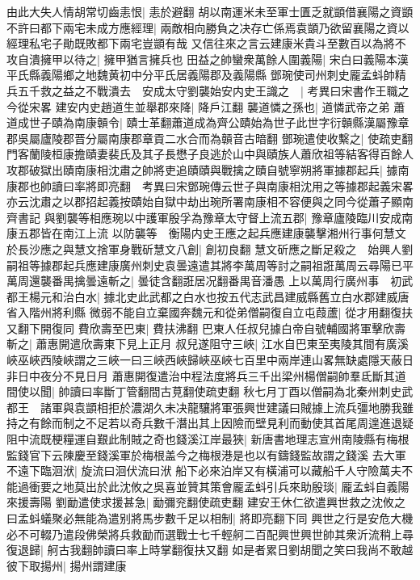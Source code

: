 由此大失人情胡常切齒恚恨|{
	恚於避翻}
胡以南運米未至軍士匱乏就顗借襄陽之資顗不許曰都下兩宅未成方應經理|{
	兩敵相向勝負之决存亡係焉袁顗乃欲留襄陽之資以經理私宅子勛既敗都下兩宅豈顗有哉}
又信往來之言云建康米貴斗至數百以為將不攻自潰擁甲以待之|{
	擁甲猶言擁兵也}
田益之帥蠻衆萬餘人圍義陽|{
	宋白曰義陽本漢平氏縣義陽鄉之地魏黄初中分平氏居義陽郡及義陽縣}
鄧琬使司州刺史龎孟蚪帥精兵五千救之益之不戰潰去　安成太守劉襲始安内史王識之　|{
	考異曰宋書作王職之今從宋畧}
建安内史趙道生並舉郡來降|{
	降戶江翻}
襲道憐之孫也|{
	道憐武帝之弟}
蕭道成世子賾為南康贑令|{
	賾士革翻蕭道成為齊公賾始為世子此世字衍贑縣漢屬豫章郡吳屬廬陵郡晋分屬南康郡章貢二水合而為贑音古暗翻}
鄧琬遣使收繫之|{
	使疏吏翻}
門客蘭陵桓康擔賾妻裴氏及其子長懋子良逃於山中與賾族人蕭欣祖等結客得百餘人攻郡破獄出賾南康相沈肅之帥將吏追賾賾與戰擒之賾自號寧朔將軍據郡起兵|{
	據南康郡也帥讀曰率將即亮翻　考異曰宋鄧琬傳云世子與南康相沈用之等據郡起義宋畧亦云沈肅之以郡招起義按賾始自獄中劫出琬所署南康相不容便與之同今從蕭子顯南齊書記}
與劉襲等相應琬以中護軍殷孚為豫章太守督上流五郡|{
	豫章廬陵臨川安成南康五郡皆在南江上流}
以防襲等　衡陽内史王應之起兵應建康襲擊湘州行事何慧文於長沙應之與慧文捨軍身戰斫慧文八創|{
	創初良翻}
慧文斫應之斷足殺之　始興人劉嗣祖等據郡起兵應建康廣州刺史袁曇遠遣其將李萬周等討之嗣祖誑萬周云尋陽已平萬周還襲番禺擒曇遠斬之|{
	曇徒含翻誑居况翻番禺音潘愚}
上以萬周行廣州事　初武都王楊元和治白水|{
	據北史此武都之白水也按五代志武昌建威縣舊立白水郡建威唐省入階州將利縣}
微弱不能自立棄國奔魏元和從弟僧嗣復自立屯葭蘆|{
	從才用翻復扶又翻下開復同}
費欣壽至巴東|{
	費扶沸翻}
巴東人任叔兒據白帝自號輔國將軍擊欣壽斬之|{
	蕭惠開遣欣壽東下見上正月}
叔兒遂阻守三峽|{
	江水自巴東至夷陵其間有廣溪峽巫峽西陵峽謂之三峽一曰三峽西峽歸峽巫峽七百里中兩岸連山畧無缺處隱天蔽日非日中夜分不見日月}
蕭惠開復遣治中程法度將兵三千出梁州楊僧嗣帥羣氐斷其道間使以聞|{
	帥讀曰率斷丁管翻間古莧翻使疏吏翻}
秋七月丁酉以僧嗣為北秦州刺史武都王　諸軍與袁顗相拒於濃湖久未决龍驤將軍張興世建議曰賊據上流兵彊地勝我雖持之有餘而制之不足若以奇兵數千潛出其上因險而壁見利而動使其首尾周遑進退疑阻中流既梗糧運自艱此制賊之奇也錢溪江岸最狹|{
	新唐書地理志宣州南陵縣有梅根監錢官下云陳慶至錢溪軍於梅根盖今之梅根港是也以有鑄錢監故謂之錢溪}
去大軍不遠下臨洄洑|{
	旋流曰洄伏流曰洑}
船下必來泊岸又有橫浦可以藏船千人守險萬夫不能過衝要之地莫出於此沈攸之吳喜並贊其策會龎孟蚪引兵來助殷琰|{
	龎孟蚪自義陽來援壽陽}
劉勔遣使求援甚急|{
	勔彌兖翻使疏吏翻}
建安王休仁欲遣興世救之沈攸之曰孟蚪蟻聚必無能為遣别將馬步數千足以相制|{
	將即亮翻下同}
興世之行是安危大機必不可輟乃遣段佛榮將兵救勔而選戰士七千輕舸二百配興世興世帥其衆沂流稍上尋復退歸|{
	舸古我翻帥讀曰率上時掌翻復扶又翻}
如是者累日劉胡聞之笑曰我尚不敢越彼下取揚州|{
	揚州謂建康}
